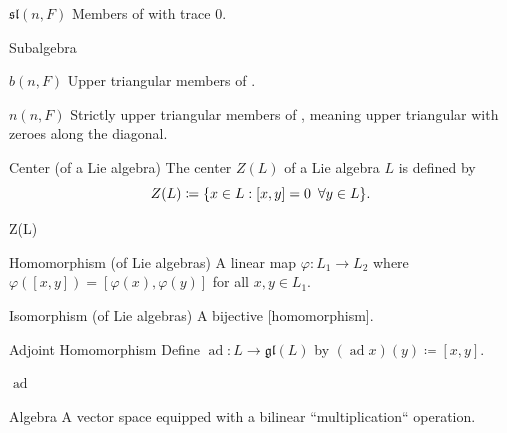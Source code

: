 \documentclass[12pt]{article}
\newcommand{\gl}{\mathfrak{gl}}
\renewcommand{\sl}{\mathfrak{sl}}
\DeclareMathOperator{\ad}{ad}
\begin{document}
\begin{def-entry}{$\sl(n, F)$}
    Members of  with trace 0.
\end{def-entry}

\begin{def-entry}{Subalgebra}
\end{def-entry}

\begin{def-entry}[b-nf]{$b(n, F)$}
    Upper triangular members of .
\end{def-entry}

\begin{def-entry}[n-nf]{$n(n, F)$}
    Strictly upper triangular members of , meaning upper triangular with zeroes along the diagonal.
\end{def-entry}

\begin{def-entry}[center]{Center (of a Lie algebra)}
    The center $Z(L)$ of a Lie algebra $L$ is defined by
    $$Z(L) \coloneq \lbrace x \in L : [x, y] = 0 \hspace{.5em} \forall y \in L \rbrace.$$
\end{def-entry}

\begin{def-entry}{Z(L)}
\end{def-entry}

\begin{def-entry}[homomorphism]{Homomorphism (of Lie algebras)}
    A linear map $\varphi : L_1 \to L_2$ where $\varphi([x, y]) = [\varphi(x), \varphi(y)]$ for all $x, y \in L_1$.
\end{def-entry}

\begin{def-entry}[isomorphism]{Isomorphism (of Lie algebras)}
    A bijective [homomorphism].    
\end{def-entry}

\begin{def-entry}{Adjoint Homomorphism}
    Define $\ad : L \to \gl(L)$ by $(\ad x)(y) \coloneq [x, y]$.
\end{def-entry}

\begin{def-entry}{$\ad$}
\end{def-entry}

\begin{def-entry}{Algebra}
    A vector space equipped with a bilinear ``multiplication`` operation.
\end{def-entry}
\end{document}
